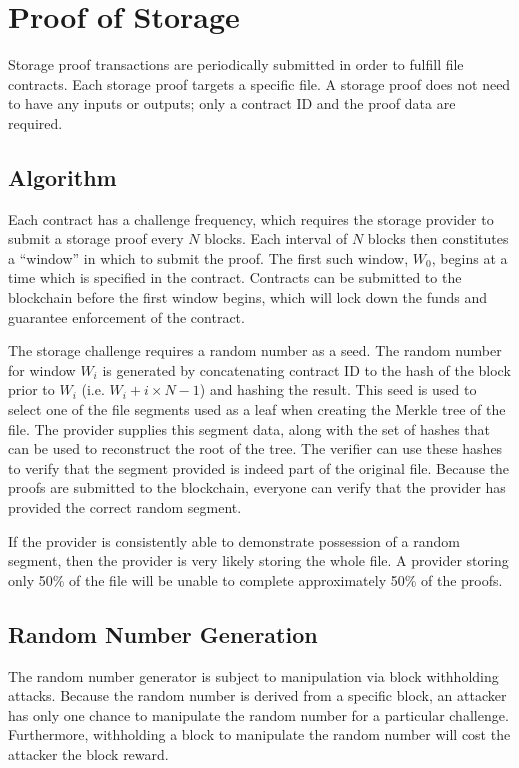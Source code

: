 \documentclass[twocolumn]{article}
\begin{document}
\section{Proof of Storage}
\label{sec:storage}
Storage proof transactions are periodically submitted in order to fulfill file contracts.
Each storage proof targets a specific file.
A storage proof does not need to have any inputs or outputs; only a contract ID and the proof data are required.

\subsection{Algorithm}
Each contract has a challenge frequency, which requires the storage provider to submit a storage proof every $N$ blocks.
Each interval of $N$ blocks then constitutes a ``window'' in which to submit the proof.
The first such window, $W_0$, begins at a time which is specified in the contract.
Contracts can be submitted to the blockchain before the first window begins, which will lock down the funds and guarantee enforcement of the contract.

The storage challenge requires a random number as a seed.
The random number for window $W_i$ is generated by concatenating contract ID to the hash of the block prior to $W_i$ (i.e. $W_i + i \times N - 1$) and hashing the result.
This seed is used to select one of the file segments used as a leaf when creating the Merkle tree of the file.
The provider supplies this segment data, along with the set of hashes that can be used to reconstruct the root of the tree.
The verifier can use these hashes to verify that the segment provided is indeed part of the original file.
Because the proofs are submitted to the blockchain, everyone can verify that the provider has provided the correct random segment.


If the provider is consistently able to demonstrate possession of a random segment, then the provider is very likely storing the whole file.
A provider storing only 50\% of the file will be unable to complete approximately 50\% of the proofs.

\subsection{Random Number Generation}
The random number generator is subject to manipulation via block withholding attacks.
Because the random number is derived from a specific block, an attacker has only one chance to manipulate the random number for a particular challenge.
Furthermore, withholding a block to manipulate the random number will cost the attacker the block reward.
\end{document}
